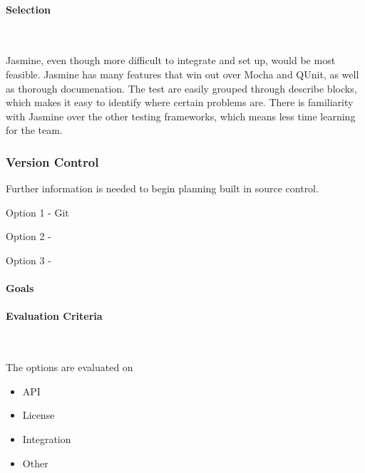 \documentclass[letterpaper, 10pt, draftclsnofoot, compsoc, onecolumn]{IEEEtran}
\begin{document}
{\medskip
\paragraph{Selection} ~\\
{\noindent Jasmine, even though more difficult to integrate and set up, would be most feasible. Jasmine has many features that win out over Mocha and QUnit, as well as thorough documenation. The test are easily grouped through describe blocks, which makes it easy to identify where certain problems are. There is familiarity with Jasmine over the other testing frameworks, which means less time learning for the team.\par}


\medskip

\newpage
\subsubsection{Version Control}
{\noindent Further information is needed to begin planning built in source control. \par}

{\noindent Option 1 - Git \par}
{\noindent \par}

\medskip
{\noindent Option 2 - \par}
{\noindent \par}

\medskip
{\noindent Option 3 - \par}
{\noindent \par}

\medskip
\paragraph{Goals}
{\noindent \par}

\medskip
\newpage
\paragraph{Evaluation Criteria} ~\\
{\noindent The options are evaluated on 

\begin{itemize}
\item API
\item License
\item Integration
\item Other
\end{itemize}

}}
\end{document}
